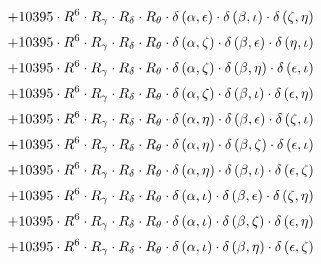 \begin{subequations}
\begin{gather}
 \\[0.2em] \notag 		 + 10395 \cdot R^{6} \cdot R_{\gamma{}} \cdot R_{\delta{}} \cdot R_{\theta{}} \cdot \delta{}\left(\alpha{}, \epsilon{}\right) \cdot \delta{}\left(\beta{}, \iota{}\right) \cdot \delta{}\left(\zeta{}, \eta{}\right) 
 \\[0.2em] \notag 		 + 10395 \cdot R^{6} \cdot R_{\gamma{}} \cdot R_{\delta{}} \cdot R_{\theta{}} \cdot \delta{}\left(\alpha{}, \zeta{}\right) \cdot \delta{}\left(\beta{}, \epsilon{}\right) \cdot \delta{}\left(\eta{}, \iota{}\right) 
 \\[0.2em] \notag 		 + 10395 \cdot R^{6} \cdot R_{\gamma{}} \cdot R_{\delta{}} \cdot R_{\theta{}} \cdot \delta{}\left(\alpha{}, \zeta{}\right) \cdot \delta{}\left(\beta{}, \eta{}\right) \cdot \delta{}\left(\epsilon{}, \iota{}\right) 
 \\[0.2em] \notag 		 + 10395 \cdot R^{6} \cdot R_{\gamma{}} \cdot R_{\delta{}} \cdot R_{\theta{}} \cdot \delta{}\left(\alpha{}, \zeta{}\right) \cdot \delta{}\left(\beta{}, \iota{}\right) \cdot \delta{}\left(\epsilon{}, \eta{}\right) 
 \\[0.2em] \notag 		 + 10395 \cdot R^{6} \cdot R_{\gamma{}} \cdot R_{\delta{}} \cdot R_{\theta{}} \cdot \delta{}\left(\alpha{}, \eta{}\right) \cdot \delta{}\left(\beta{}, \epsilon{}\right) \cdot \delta{}\left(\zeta{}, \iota{}\right) 
 \\[0.2em] \notag 		 + 10395 \cdot R^{6} \cdot R_{\gamma{}} \cdot R_{\delta{}} \cdot R_{\theta{}} \cdot \delta{}\left(\alpha{}, \eta{}\right) \cdot \delta{}\left(\beta{}, \zeta{}\right) \cdot \delta{}\left(\epsilon{}, \iota{}\right) 
 \\[0.2em] \notag 		 + 10395 \cdot R^{6} \cdot R_{\gamma{}} \cdot R_{\delta{}} \cdot R_{\theta{}} \cdot \delta{}\left(\alpha{}, \eta{}\right) \cdot \delta{}\left(\beta{}, \iota{}\right) \cdot \delta{}\left(\epsilon{}, \zeta{}\right) 
 \\[0.2em] \notag 		 + 10395 \cdot R^{6} \cdot R_{\gamma{}} \cdot R_{\delta{}} \cdot R_{\theta{}} \cdot \delta{}\left(\alpha{}, \iota{}\right) \cdot \delta{}\left(\beta{}, \epsilon{}\right) \cdot \delta{}\left(\zeta{}, \eta{}\right) 
 \\[0.2em] \notag 		 + 10395 \cdot R^{6} \cdot R_{\gamma{}} \cdot R_{\delta{}} \cdot R_{\theta{}} \cdot \delta{}\left(\alpha{}, \iota{}\right) \cdot \delta{}\left(\beta{}, \zeta{}\right) \cdot \delta{}\left(\epsilon{}, \eta{}\right) 
 \\[0.2em] \notag 		 + 10395 \cdot R^{6} \cdot R_{\gamma{}} \cdot R_{\delta{}} \cdot R_{\theta{}} \cdot \delta{}\left(\alpha{}, \iota{}\right) \cdot \delta{}\left(\beta{}, \eta{}\right) \cdot \delta{}\left(\epsilon{}, \zeta{}\right) 

\end{gather}
\end{subequations}
